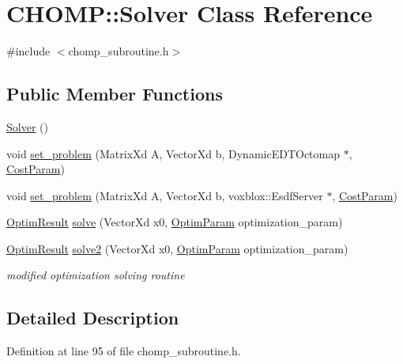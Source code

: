 \hypertarget{class_c_h_o_m_p_1_1_solver}{}\section{C\+H\+O\+MP\+:\+:Solver Class Reference}
\label{class_c_h_o_m_p_1_1_solver}


{\ttfamily \#include $<$chomp\+\_\+subroutine.\+h$>$}

\subsection*{Public Member Functions}
\begin{DoxyCompactItemize}
\item 
\hyperlink{class_c_h_o_m_p_1_1_solver_a9dfe7ae9ce617e8a6398be34284c907a}{Solver} ()
\item 
void \hyperlink{class_c_h_o_m_p_1_1_solver_ac27fc3241bd65b38d832d9838ab64641}{set\+\_\+problem} (Matrix\+Xd A, Vector\+Xd b, Dynamic\+E\+D\+T\+Octomap $\ast$, \hyperlink{struct_c_h_o_m_p_1_1_cost_param}{Cost\+Param})
\item 
void \hyperlink{class_c_h_o_m_p_1_1_solver_a8a87ee9ad9182fd2e4e913cb24051a6c}{set\+\_\+problem} (Matrix\+Xd A, Vector\+Xd b, voxblox\+::\+Esdf\+Server $\ast$, \hyperlink{struct_c_h_o_m_p_1_1_cost_param}{Cost\+Param})
\item 
\hyperlink{struct_c_h_o_m_p_1_1_optim_result}{Optim\+Result} \hyperlink{class_c_h_o_m_p_1_1_solver_a677d1b1adb6a2c4f490d47f5fcabfe0d}{solve} (Vector\+Xd x0, \hyperlink{struct_c_h_o_m_p_1_1_optim_param}{Optim\+Param} optimization\+\_\+param)
\item 
\hyperlink{struct_c_h_o_m_p_1_1_optim_result}{Optim\+Result} \hyperlink{class_c_h_o_m_p_1_1_solver_a43e2f6c0f831b988ae6c578117343e5d}{solve2} (Vector\+Xd x0, \hyperlink{struct_c_h_o_m_p_1_1_optim_param}{Optim\+Param} optimization\+\_\+param)
\begin{DoxyCompactList}\small\item\em modified optimization solving routine \end{DoxyCompactList}\end{DoxyCompactItemize}


\subsection{Detailed Description}


Definition at line 95 of file chomp\+\_\+subroutine.\+h.



